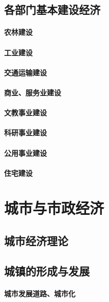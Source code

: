 \documentclass[UTF8]{../../RepresentationUniverse}
\begin{document}
    \section{各部门基本建设经济}
        \subsubsection{农林建设}
        \subsubsection{工业建设}
        \subsubsection{交通运输建设}
        \subsubsection{商业、服务业建设}
        \subsubsection{文教事业建设}
        \subsubsection{科研事业建设}
        \subsubsection{公用事业建设}
        \subsubsection{住宅建设}




\chapter{城市与市政经济}
\section{城市经济理论}
\section{城镇的形成与发展}
    \subsubsection{城市发展道路、城市化}
\end{document}
